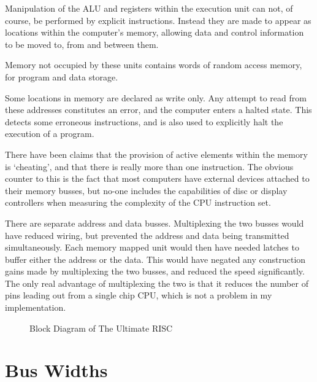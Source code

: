 Manipulation of the ALU and registers within the execution 
unit can not, of course, be performed by  explicit instructions.  
Instead they are made to appear as locations within the computer's memory,
allowing data and control information to be moved to, from and between them.

Memory not occupied by these units contains 
words of random access memory, for  program and 
data storage.

Some locations in memory are declared as write only. Any attempt to read from these addresses constitutes an error, and the computer  enters a halted state.
This  detects some erroneous instructions, and
 is also used to explicitly halt the execution of a program.

There have  been claims that the provision of active elements within the memory is `cheating', and that there is really more than one instruction.
The obvious counter to this is the fact that  most computers have external devices attached to their memory busses, but no-one includes the capabilities of disc or display controllers when measuring the complexity of the CPU instruction set.


There are separate address and data busses. Multiplexing the two busses would have reduced wiring, but prevented the address and data being transmitted
simultaneously. 
Each memory mapped unit would then have needed latches to buffer either the address or the data. This would have negated any  construction gains made by multiplexing the two busses, and reduced the speed significantly. 
The only real advantage of multiplexing the two is that it reduces the number of pins leading out from a single chip CPU, which is not a problem in my implementation.

\newpage
\begin{figure}
\vspace{20cm}
\caption{Block Diagram of The Ultimate RISC}
\label{figure:block}
\end{figure}
\clearpage
\section{Bus Widths}


